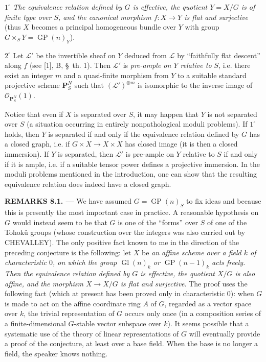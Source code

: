 \smallskip
\noindent $1^\circ$ \emph{The equivalence relation defined by $G$ is
effective, the quotient $Y=X/G$ is of finite type over $S$, and the canonical
morphism $f:X\to Y$ is flat and surjective} (thus $X$ becomes a principal
homogeneous bundle over $Y$ with group
$G\times_S Y=\operatorname{GP}(n)_Y$).

\smallskip
\noindent $2^\circ$ Let $\mathcal L'$ be the invertible sheaf on $Y$ deduced
from $\mathcal L$ by ``faithfully flat descent'' along $f$ (see [1], B,
\S~th. 1). Then $\mathcal L'$ is \emph{pre-ample on $Y$ relative to $S$}, i.e.
there exist an integer $m$ and a quasi-finite morphism from $Y$ to a suitable
standard projective scheme $\mathbf P_S^N$ such that
$(\mathcal L')^{\otimes m}$ is isomorphic to the inverse image of
$\mathcal O_{\mathbf P_S^N}(1)$.

Notice that even if $X$ is separated over $S$, it may happen that $Y$ is not
separated over $S$ (a situation occurring in entirely nonpathological moduli
problems). If $1^\circ$ holds, then $Y$ is separated if and only if the
equivalence relation defined by $G$ has a closed graph, i.e. if
$G\times X\to X\times X$ has closed image (it is then a closed immersion). If
$Y$ is separated, then $\mathcal L'$ is pre-ample on $Y$ relative to $S$ if
and only if it is ample, i.e. if a suitable tensor power defines a projective
immersion. In the moduli problems mentioned in the introduction, one can show
that the resulting equivalence relation does indeed have a closed graph.

\medskip
\noindent\textbf{REMARKS 8.1. ---} We have assumed
$G=\operatorname{GP}(n)_S$ to fix ideas and because this is presently the most
important case in practice. A reasonable hypothesis on $G$ would instead seem
to be that $G$ is one of the ``forms'' over $S$ of one of the Tohokû groups
(whose construction over the integers was also carried out by CHEVALLEY). The
only positive fact known to me in the direction of the preceding conjecture
is the following: let $X$ be \emph{an affine scheme over a field $k$ of
characteristic $0$, on which the group $\operatorname{Gl}(n)_k$ or
$\operatorname{GP}(n-1)_k$ acts freely. Then the equivalence relation defined
by $G$ is effective, the quotient $X/G$ is also affine, and the morphism
$X\to X/G$ is flat and surjective}. The proof uses the following fact (which
at present has been proved only in characteristic $0$): when $G$ is made to
act on the affine coordinate ring $A$ of $G$, regarded as a vector space over
$k$, the trivial representation of $G$ occurs only once (in a composition
series of a finite-dimensional $G$-stable vector subspace over $k$). It seems
possible that a systematic use of
the theory of linear representations of $G$ will eventually provide a proof
of the conjecture, at least over a base field. When the base is no longer a
field, the speaker knows nothing.


